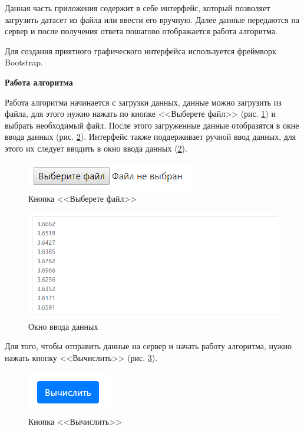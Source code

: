 \documentclass[a4paper,14pt]{article}
\begin{document}
	Данная часть приложения содержит в себе интерфейс, который позволяет загрузить датасет из файла или ввести его вручную. 
	Далее данные передаются на сервер и после получения ответа пошагово отображается работа алгоритма.
	
	Для создания приятного графического интерфейса используется фреймворк Bootstrap.
	
\textbf{Работа алгоритма}
	
	Работа алгоритма начинается с загрузки данных, данные можно загрузить из файла, для этого нужно нажать по кнопке <<Выберете файл>> (рис. \ref{fig:screenshot001}) и выбрать необходимый файл.
	После этого загруженные данные отобразятся в окне ввода данных (рис. \ref{fig:screenshot002}).
	Интерфейс также поддерживает ручной ввод данных, для этого их следует вводить в окно ввода данных (\ref{fig:screenshot002}).
	
	\begin{figure}[H]
		\centering
		\includegraphics[width=0.4\linewidth]{images/screenshot001}
		\caption{Кнопка <<Выберете файл>>}
		\label{fig:screenshot001}
	\end{figure}
	
	
	\begin{figure}[H]
		\centering
		\includegraphics[width=0.7\linewidth]{images/screenshot002}
		\caption{Окно ввода данных}
		\label{fig:screenshot002}
	\end{figure}
	
	Для того, чтобы отправить  данные на сервер и начать работу алгоритма, нужно нажать кнопку <<Вычислить>> (рис. \ref{fig:screenshot003}).
	
	\begin{figure}[H]
		\centering
		\includegraphics[width=0.2\linewidth]{images/screenshot003}
		\caption{Кнопка <<Вычислить>>}
		\label{fig:screenshot003}
	\end{figure}
\end{document}
